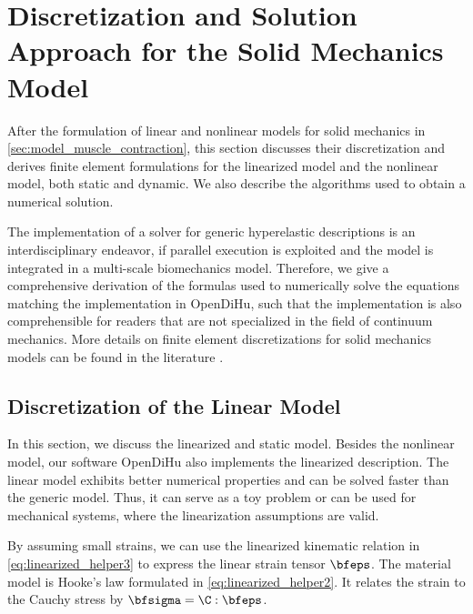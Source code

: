 
\section{Discretization and Solution Approach for the Solid Mechanics Model}\label{sec:discretization_mechanics}

After the formulation of linear and nonlinear models for solid mechanics in \cref{sec:model_muscle_contraction}, this section discusses their discretization and derives finite element formulations for the linearized model and the nonlinear model, both static and dynamic.
We also describe the algorithms used to obtain a numerical solution.

The implementation of a solver for generic hyperelastic descriptions is an interdisciplinary endeavor, if parallel execution is exploited and the model is integrated in a multi-scale biomechanics model.
Therefore, we give a comprehensive derivation of the formulas used to numerically solve the equations matching the implementation in OpenDiHu, such that the implementation is also comprehensible for readers that are not specialized in the field of continuum mechanics. More details on finite element discretizations for solid mechanics models can be found in the literature \cite{zienkiewicz1977finite,SUSSMAN1987357,zienkiewicz2005finite}.

\subsection{Discretization of the Linear Model}\label{sec:linearized_mechanics_model}

In this section, we discuss the linearized and static model. Besides the nonlinear model, our software OpenDiHu also implements the linearized description. The linear model exhibits better numerical properties and can be solved faster than the generic model. Thus, it can serve as a toy problem or can be used for mechanical systems, where the linearization assumptions are valid.

By assuming small strains, we can use the linearized kinematic relation in \cref{eq:linearized_helper3} to express the linear strain tensor $\bfeps$. The material model is Hooke's law formulated in \cref{eq:linearized_helper2}. It relates the strain to the Cauchy stress by $\bfsigma = \C:\bfeps$.


